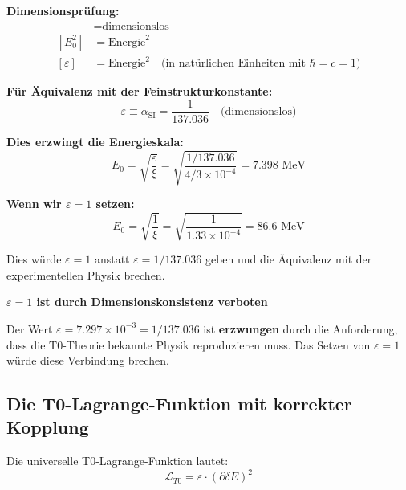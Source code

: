 \documentclass[12pt,a4paper]{article}
\numberwithin{equation}{section}
\newcommand{\xipar}{\xi}
\newcommand{\epsilonT}{\varepsilon}
\newcommand{\alphaSI}{\alpha_{\text{SI}}}
\newcommand{\calL}{\mathcal{L}}
\newcommand{\Eo}{E_0}
\begin{document}
	\textbf{Dimensionsprüfung:}
	\begin{align}
		[\xipar] &= \text{dimensionslos} \\
		[\Eo^2] &= \text{Energie}^2 \\
		[\epsilonT] &= \text{Energie}^2 \quad \text{(in natürlichen Einheiten mit } \hbar = c = 1\text{)}
		\label{eq:dimensions}
	\end{align}
	
	\textbf{Für Äquivalenz mit der Feinstrukturkonstante:}
	\begin{equation}
		\epsilonT \equiv \alphaSI = \frac{1}{137.036} \quad \text{(dimensionslos)}
		\label{eq:equivalence_simple}
	\end{equation}
	
	\textbf{Dies erzwingt die Energieskala:}
	\begin{equation}
		\Eo = \sqrt{\frac{ \epsilonT}{\xipar}} = \sqrt{\frac{1/137.036}{4/3 \times 10^{-4}}} = 7.398 \text{ MeV}
		\label{eq:e0_forced}
	\end{equation}
	
	\textbf{Wenn wir $\epsilonT = 1$ setzen:}
	\begin{equation}
		\Eo = \sqrt{\frac{1}{\xipar}} = \sqrt{\frac{1}{1.33 \times 10^{-4}}} = 86.6 \text{ MeV}
		\label{eq:e0_wrong}
	\end{equation}
	
	Dies würde $\epsilonT = 1$ anstatt $\epsilonT = 1/137.036$ geben und die Äquivalenz mit der experimentellen Physik brechen.
	
	\begin{tcolorbox}[title={\textbf{SCHLUSSFOLGERUNG}},colframe=blue,colback=blue!5]
		\textbf{$\epsilonT = 1$ ist durch Dimensionskonsistenz verboten}
		
		Der Wert $\epsilonT = 7.297 \times 10^{-3} = 1/137.036$ ist \textbf{erzwungen} durch die Anforderung, dass die T0-Theorie bekannte Physik reproduzieren muss. Das Setzen von $\epsilonT = 1$ würde diese Verbindung brechen.
	\end{tcolorbox}
	
	\subsection{Die T0-Lagrange-Funktion mit korrekter Kopplung}
	
	Die universelle T0-Lagrange-Funktion lautet:
	\begin{equation}
		\calL_{T0} = \epsilonT \cdot (\partial \delta E)^2
		\label{eq:t0_lagrangian}
	\end{equation}
	
\end{document}
